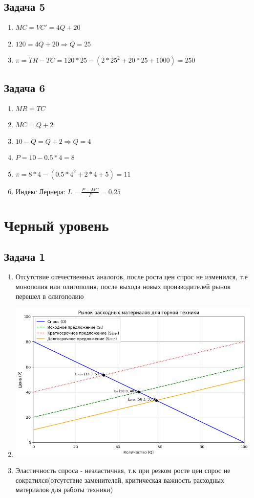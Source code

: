 \documentclass[a4paper,12pt]{article}
\begin{document}
\subsection{Задача 5}
\begin{enumerate}
    \item $MC = VC' = 4Q+20$
    \item $120 = 4Q + 20 \Rightarrow Q = 25$
    \item $\pi = TR - TC = 120*25 - (2*25^2+20*25+1000)=250$
\end{enumerate}

\subsection{Задача 6}
\begin{enumerate}
    \item $MR = TC$
    \item $MC = Q + 2$
    \item $10-Q=Q+2 \Rightarrow Q = 4$
    \item $P = 10-0.5*4=8$
    \item $\pi = 8*4-(0.5*4^2+2*4+5)=11$
    \item Индекс Лернера: $L = \frac{P-MC}{P}=0.25$
\end{enumerate}

\section{Черный уровень}
\subsection{Задача 1}
\begin{enumerate}
    \item Отсутствие отечественных аналогов, после роста цен спрос не изменился, т.е монополия или олигополия, после выхода новых производителей рынок перешел в олигополию
    \item \includegraphics[scale=0.5]{graphs/7.1.png}
    \item Эластичность спроса - неэластичная, т.к при резком росте цен спрос не сократился(отсутствие заменителей, критическая важность расходных материалов для работы техники)
\end{enumerate}
\end{document}
